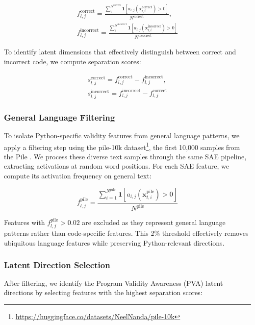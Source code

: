 \documentclass[11pt]{article}
\begin{document}
\begin{align}
    f_{l,j}^{\text{correct}} = \frac{\sum_{i}^{N^{\text{correct}}} \mathbf{1}[a_{l,j}(\mathbf{x}_{l,i}^{\text{correct}}) > 0]}{N^{\text{correct}}}, \\  
    f_{l,j}^{\text{incorrect}} = \frac{\sum_{i}^{N^{\text{incorrect}}} \mathbf{1} [a_{l,j}(\mathbf{x}_{l,i}^{\text{incorrect}}) > 0]}{N^{\text{incorrect}}}
\end{align}

To identify latent dimensions that effectively distinguish between correct and incorrect code, we compute separation scores:

\begin{align}
    s_{l,j}^{\text{correct}} = f_{l,j}^{\text{correct}} - f_{l,j}^{\text{incorrect}}, \\
    s_{l,j}^{\text{incorrect}} = f_{l,j}^{\text{incorrect}} - f_{l,j}^{\text{correct}}
\end{align}

\subsubsection{General Language Filtering}

To isolate Python-specific validity features from general language patterns, we apply a filtering step using the pile-10k dataset\footnote{\url{https://huggingface.co/datasets/NeelNanda/pile-10k}}, the first 10,000 samples from the Pile \citep{gao2020pile}. We process these diverse text samples through the same SAE pipeline, extracting activations at random word positions. For each SAE feature, we compute its activation frequency on general text:

\begin{equation}
f_{l,j}^{\text{pile}} = \frac{\sum_{i=1}^{N^{\text{pile}}} \mathbf{1}[a_{l,j}(\mathbf{x}_{l,i}^{\text{pile}}) > 0]}{N^{\text{pile}}}
\end{equation}

Features with $f_{l,j}^{\text{pile}} > 0.02$ are excluded as they represent general language patterns rather than code-specific features. This 2\% threshold effectively removes ubiquitous language features while preserving Python-relevant directions.

\subsubsection{Latent Direction Selection}

After filtering, we identify the Program Validity Awareness (PVA) latent directions by selecting features with the highest separation scores:
\end{document}
